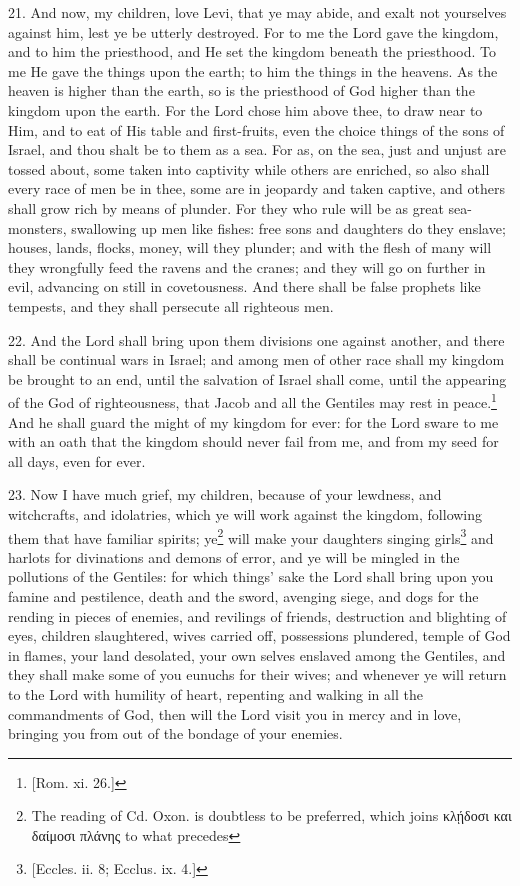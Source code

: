 21. And now, my children, love Levi, that ye may abide, and exalt not yourselves against him, lest ye be utterly destroyed. For to me the Lord gave the kingdom, and to him the priesthood, and He set the kingdom beneath the priesthood. To me He gave the things upon the earth; to him the things in the heavens. As the heaven is higher than the earth, so is the priesthood of God higher than the kingdom upon the earth. For the Lord chose him above thee, to draw near to Him, and to eat of His table and first-fruits, even the choice things of the sons of Israel, and thou shalt be to them as a sea. For as, on the sea, just and unjust are tossed about, some taken into captivity while others are enriched, so also shall every race of men be in thee, some are in jeopardy and taken captive, and others shall grow rich by means of plunder. For they who rule will be as great sea-monsters, swallowing up men like fishes: free sons and daughters do they enslave; houses, lands, flocks, money, will they plunder; and with the flesh of many will they wrongfully feed the ravens and the cranes; and they will go on further in evil, advancing on still in covetousness. And there shall be false prophets like tempests, and they shall persecute all righteous men.

22. And the Lord shall bring upon them divisions one against another, and there shall be continual wars in Israel; and among men of other race shall my kingdom be brought to an end, until the salvation of Israel shall come, until the appearing of the God of righteousness, that Jacob and all the Gentiles may rest in peace.\footnote{[Rom. xi. 26.]} And he shall guard the might of my kingdom for ever: for the Lord sware to me with an oath that the kingdom should never fail from me, and from my seed for all days, even for ever.

23. Now I have much grief, my children, because of your lewdness, and witchcrafts, and idolatries, which ye will work against the kingdom, following them that have familiar spirits; ye\footnote{The reading of Cd. Oxon. is doubtless to be preferred, which joins \textgreek{κλῄδοσι και δαίμοσι πλάνης} to what precedes} will make your daughters singing girls\footnote{[Eccles. ii. 8; Ecclus. ix. 4.]} and harlots for divinations and demons of error, and ye will be mingled in the pollutions of the Gentiles: for which things’ sake the Lord shall bring upon you famine and pestilence, death and the sword, avenging siege, and dogs for the rending in pieces of enemies, and revilings of friends, destruction and blighting of eyes, children slaughtered, wives carried off, possessions plundered, temple of God in flames, your land desolated, your own selves enslaved among the Gentiles, and they shall make some of you eunuchs for their wives; and whenever ye will return to the Lord with humility of heart, repenting and walking in all the commandments of God, then will the Lord visit you in mercy and in love, bringing you from out of the bondage of your enemies.


